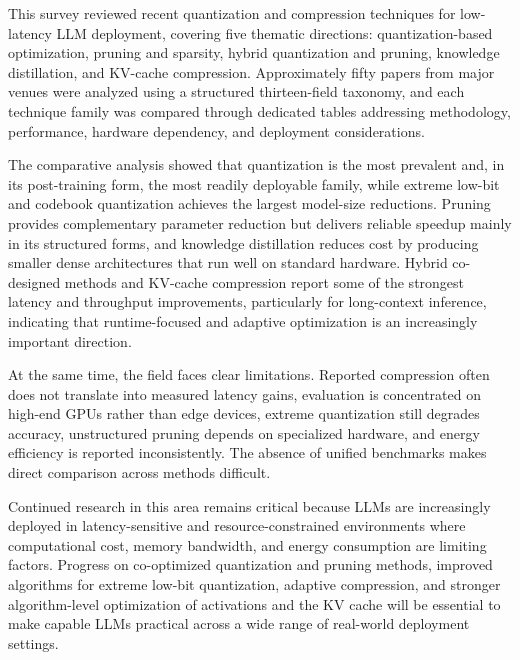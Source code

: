 This survey reviewed recent quantization and compression techniques for low-latency LLM deployment, covering five thematic directions: quantization-based optimization, pruning and sparsity, hybrid quantization and pruning, knowledge distillation, and KV-cache compression. Approximately fifty papers from major venues were analyzed using a structured thirteen-field taxonomy, and each technique family was compared through dedicated tables addressing methodology, performance, hardware dependency, and deployment considerations.

The comparative analysis showed that quantization is the most prevalent and, in its post-training form, the most readily deployable family, while extreme low-bit and codebook quantization achieves the largest model-size reductions. Pruning provides complementary parameter reduction but delivers reliable speedup mainly in its structured forms, and knowledge distillation reduces cost by producing smaller dense architectures that run well on standard hardware. Hybrid co-designed methods and KV-cache compression report some of the strongest latency and throughput improvements, particularly for long-context inference, indicating that runtime-focused and adaptive optimization is an increasingly important direction.

At the same time, the field faces clear limitations. Reported compression often does not translate into measured latency gains, evaluation is concentrated on high-end GPUs rather than edge devices, extreme quantization still degrades accuracy, unstructured pruning depends on specialized hardware, and energy efficiency is reported inconsistently. The absence of unified benchmarks makes direct comparison across methods difficult.

Continued research in this area remains critical because LLMs are increasingly deployed in latency-sensitive and resource-constrained environments where computational cost, memory bandwidth, and energy consumption are limiting factors. Progress on co-optimized quantization and pruning methods, improved algorithms for extreme low-bit quantization, adaptive compression, and stronger algorithm-level optimization of activations and the KV cache will be essential to make capable LLMs practical across a wide range of real-world deployment settings.
